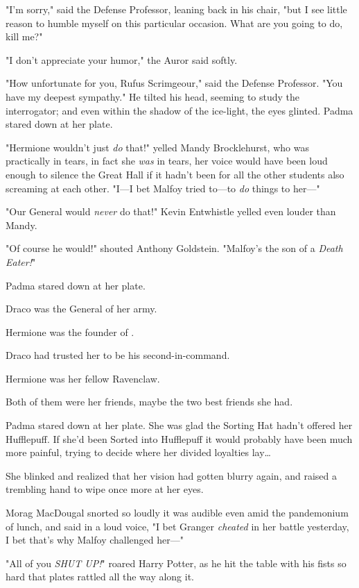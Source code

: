 "I'm sorry," said the Defense Professor, leaning back in his chair, "but I see
little reason to humble myself on this particular occasion. What are you going
to do, kill me?"

"I don't appreciate your humor," the Auror said softly.

"How unfortunate for you, Rufus Scrimgeour," said the Defense Professor. "You
have my deepest sympathy." He tilted his head, seeming to study the
interrogator; and even within the shadow of the ice-light, the eyes glinted.
\later
Padma stared down at her plate.

"Hermione wouldn't just \emph{do} that!" yelled Mandy Brocklehurst, who was
practically in tears, in fact she \emph{was} in tears, her voice would have
been loud enough to silence the Great Hall if it hadn't been for all the other
students also screaming at each other. "I---I bet Malfoy tried to---to
\emph{do} things to her---"

"Our General would \emph{never} do that!" Kevin Entwhistle yelled even louder
than Mandy.

"Of course he would!" shouted Anthony Goldstein. "Malfoy's the son of a
\emph{Death Eater!}"

Padma stared down at her plate.

Draco was the General of her army.

Hermione was the founder of \SPHEW.

Draco had trusted her to be his second-in-command.

Hermione was her fellow Ravenclaw.

Both of them were her friends, maybe the two best friends she had.

Padma stared down at her plate. She was glad the Sorting Hat hadn't offered her
Hufflepuff. If she'd been Sorted into Hufflepuff it would probably have been
much more painful, trying to decide where her divided loyalties lay{\ldots}

She blinked and realized that her vision had gotten blurry again, and raised a
trembling hand to wipe once more at her eyes.

Morag MacDougal snorted so loudly it was audible even amid the pandemonium of
lunch, and said in a loud voice, "I bet Granger \emph{cheated} in her battle
yesterday, I bet that's why Malfoy challenged her---"

"All of you \emph{SHUT UP!}" roared Harry Potter, as he hit the table with his
fists so hard that plates rattled all the way along it.

